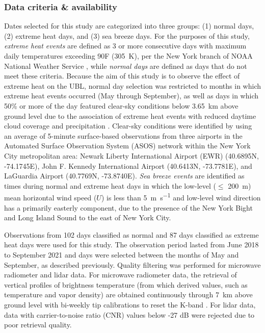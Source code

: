 \subsubsection{Data criteria \& availability}
Dates selected for this study are categorized into three groups: (1) normal days, (2) extreme heat days, and (3) sea breeze days. For the purposes of this study, \textit{extreme heat events} are defined as 3 or more consecutive days with maximum daily temperatures exceeding 90\textdegree F (\SI{305}{\kelvin}), per the New York branch of NOAA National Weather Service \citep{robinson2001, nws2018}, while \textit{normal days} are defined as days that do not meet these criteria. Because the aim of this study is to observe the effect of extreme heat on the UBL, normal day selection was restricted to months in which extreme heat events occurred (May through September), as well as days in which 50\% or more of the day featured clear-sky conditions below \SI{3.65}{\kilo\meter} above ground level due to the association of extreme heat events with reduced daytime cloud coverage and precipitation \citep{stefanon2014, thomas2020}. Clear-sky conditions were identified by using an average of 5-minute surface-based observations from three airports in the Automated Surface Observation System (ASOS) \citep{asos1998} network within the New York City metropolitan area: Newark Liberty International Airport (EWR) (40.6895\textdegree N, -74.1745\textdegree E), John F. Kennedy International Airport (40.6413\textdegree N, -73.7781\textdegree E), and LaGuardia Airport (40.7769\textdegree N, -73.8740\textdegree E). \textit{Sea breeze events} are identified as times during normal and extreme heat days in which the low-level ($\leq$ \SI{200}{\meter}) mean horizontal wind speed ($U$) is less than \SI{5}{\meter\per\second} and low-level wind direction has a primarily easterly component, due to the presence of the New York Bight and Long Island Sound to the east of New York City.

Observations from 102 days classified as normal and 87 days classified as extreme heat days were used for this study. The observation period lasted from June 2018 to September 2021 and days were selected between the months of May and September, as described previously. Quality filtering was performed for microwave radiometer and lidar data. For microwave radiometer data, the retrieval of vertical profiles of brightness temperature (from which derived values, such as temperature and vapor density) are obtained continuously through \SI{7}{\kilo\meter} above ground level with bi-weekly tip calibrations to reset the K-band \citep{shrestha2021}.  For lidar data, data with carrier-to-noise ratio (CNR) values below -27 dB were rejected \citep{kumer2014, shrestha2021} due to poor retrieval quality. 

